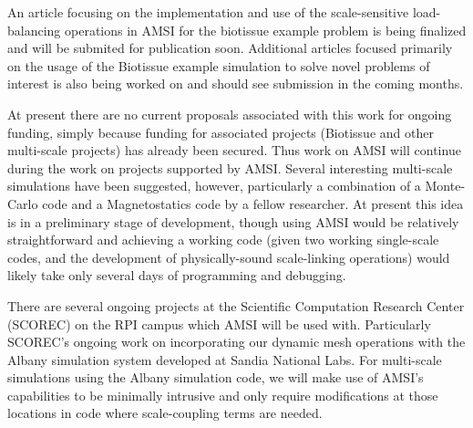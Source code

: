 An article focusing on the implementation and use of the scale-sensitive load-balancing operations in AMSI for the biotissue example problem is being finalized and will be submited for publication soon. Additional articles focused primarily on the usage of the Biotissue example simulation to solve novel problems of interest is also being worked on and should see submission in the coming months.

\label{new-propsals-funding}
At present there are no current proposals associated with this work for ongoing funding, simply because funding for associated projects (Biotissue and other multi-scale projects) has already been secured. Thus work on AMSI will continue during the work on projects supported by AMSI. Several interesting multi-scale simulations have been suggested, however, particularly a combination of a Monte-Carlo code and a Magnetostatics code by a fellow researcher. At present this idea is in a preliminary stage of development, though using AMSI would be relatively straightforward and achieving a working code (given two working single-scale codes, and the development of physically-sound scale-linking operations) would likely take only several days of programming and debugging.

\label{impact-on-programs}
There are several ongoing projects at the Scientific Computation Research Center (SCOREC) on the RPI campus which AMSI will be used with. Particularly SCOREC's ongoing work on incorporating our dynamic mesh operations with the Albany simulation system developed at Sandia National Labs. For multi-scale simulations using the Albany simulation code, we will make use of AMSI's capabilities to be minimally intrusive and only require modifications at those locations in code where scale-coupling terms are needed.
